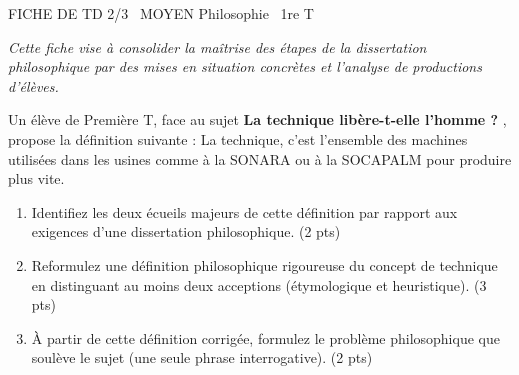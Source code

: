\documentclass[11pt]{article}
\begin{document}
\begin{tcolorbox}[enhanced,colback=popink,colframe=popink,arc=10pt,boxrule=0pt,left=12pt,right=12pt,top=9pt,bottom=9pt]
{\color{white}\popxbold\small FICHE DE TD 2/3 \textbullet\ MOYEN \hfill Philosophie \textbullet\ 1re T\par}
\end{tcolorbox}
\vspace{4pt}
\noindent \textit{Cette fiche vise à consolider la maîtrise des étapes de la dissertation philosophique par des mises en situation concrètes et l'analyse de productions d'élèves.}

\begin{exercice}
Un élève de Première T, face au sujet \og \textbf{La technique libère-t-elle l'homme ?} \fg{}, propose la définition suivante : \og La technique, c'est l'ensemble des machines utilisées dans les usines comme à la SONARA ou à la SOCAPALM pour produire plus vite. \fg{}
\begin{enumerate}
    \item Identifiez les deux écueils majeurs de cette définition par rapport aux exigences d'une dissertation philosophique. (2 pts)
    \item Reformulez une définition philosophique rigoureuse du concept de \og technique \fg{} en distinguant au moins deux acceptions (étymologique et heuristique). (3 pts)
    \item À partir de cette définition corrigée, formulez le problème philosophique que soulève le sujet (une seule phrase interrogative). (2 pts)
\end{enumerate}
\end{exercice}
\end{document}
